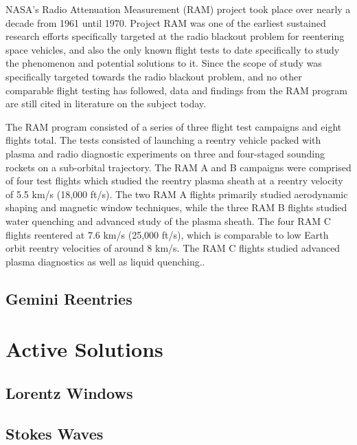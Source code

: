 \documentclass[twocolumn]{article}
\begin{document}
	NASA's Radio Attenuation Measurement (RAM) project took place over nearly a decade from 1961 until 1970.
	Project RAM was one of the earliest sustained research efforts specifically targeted at the radio blackout problem for reentering space vehicles, and also the only known flight tests to date specifically to study the phenomenon and potential solutions to it.
	Since the scope of study was specifically targeted towards the radio blackout problem, and no other comparable flight testing has followed, data and findings from the RAM program are still cited in literature on the subject today.
	
	The RAM program consisted of a series of three flight test campaigns and eight flights total.
	The tests consisted of launching a reentry vehicle packed with plasma and radio diagnostic experiments on three and four-staged sounding rockets on a sub-orbital trajectory.
	The RAM A and B campaigns were comprised of four test flights which studied the reentry plasma sheath at a reentry velocity of 5.5 km/s (18,000 ft/s).\cite{huber_entry_1971}
	The two RAM A flights primarily studied aerodynamic shaping and magnetic window techniques, while the three RAM B flights studied water quenching and advanced study of the plasma sheath.
	The four RAM C flights reentered at 7.6 km/s (25,000 ft/s), which is comparable to low Earth orbit reentry velocities of around 8 km/s.
	The RAM C flights studied advanced plasma diagnostics as well as liquid quenching.\cite{huber_entry_1971}.
	
	\subsection*{Gemini Reentries}
	

\section{Active Solutions} \label{sec:Solutions}
	
\subsection*{Lorentz Windows}
\subsection*{Stokes Waves}



\end{document}
